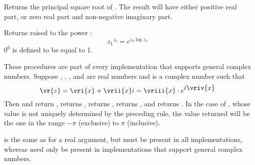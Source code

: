 \begin{entry}{%
}

Returns the principal square root of .  The result will have
either positive real part, or zero real part and non-negative imaginary
part.
\end{entry}


\begin{entry}{%
}

Returns  raised to the power :
$${z_1}^{z_2} = e^{z_2 \log {z_1}}$$
$0^0$ is defined to be equal to 1.
\end{entry}




\begin{entry}{%
}

These procedures are part of every implementation that supports
general
complex numbers.  Suppose , , , and  are
real numbers and  is a complex number such that
 $$ \vr{z} = \vri{x} + \vrii{x}\hbox{$i$}
 = \vriii{x} \cdot e^{{\displaystyle{\hbox{$i$}} \vriv{x}}}$$
Then  and  return ,
 returns ,  returns ,
 returns , and  returns .
In the case of , whose value is not uniquely determined by
the preceding rule, the value returned will be the one in the range
$-\pi$ (exclusive) to $\pi$ (inclusive).

\begin{rationale}
 is the same as  for a real argument,
but  must be present in all implementations, whereas
 need only be present in implementations that support
general complex numbers.
\end{rationale}

\end{entry}


